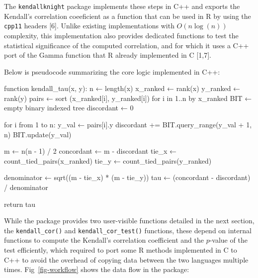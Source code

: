 \documentclass[
  10pt,
  letterpaper,
]{article}
\newenvironment{Shaded}{\begin{snugshade}}{\end{snugshade}}
\newcommand{\CommentTok}[1]{\textcolor[rgb]{0.37,0.37,0.37}{#1}}
\newcommand{\InformationTok}[1]{\textcolor[rgb]{0.37,0.37,0.37}{#1}}
\newcommand{\NormalTok}[1]{\textcolor[rgb]{0.00,0.23,0.31}{#1}}
\newcommand{\OtherTok}[1]{\textcolor[rgb]{0.00,0.23,0.31}{#1}}
\begin{document}
The \texttt{kendallknight} package implements these steps in C++ and
exports the Kendall's correlation coeeficient as a function that can be
used in R by using the \texttt{cpp11} headers {[}6{]}. Unlike existing
implementations with \(O(n \log(n))\) complexity, this implementation
also provides dedicated functions to test the statistical significance
of the computed correlation, and for which it uses a C++ port of the
Gamma function that R already implemented in C {[}1,7{]}.

Below is pseudocode summarizing the core logic implemented in C++:

\begin{Shaded}
\begin{Highlighting}[]
\NormalTok{function kendall\_tau(x, y):}
\NormalTok{    n ← length(x)}
\NormalTok{    x\_ranked ← rank(x)}
\NormalTok{    y\_ranked ← rank(y)}
\NormalTok{    pairs ← sort (x\_ranked}\CommentTok{[}\OtherTok{i}\CommentTok{]}\NormalTok{, y\_ranked}\CommentTok{[}\OtherTok{i}\CommentTok{]}\NormalTok{) for i in 1..n by x\_ranked}
\NormalTok{    BIT ← empty binary indexed tree}
\NormalTok{    discordant ← 0}

\InformationTok{    for i from 1 to n:}
\InformationTok{        y\_val ← pairs[i].y}
\InformationTok{        discordant += BIT.query\_range(y\_val + 1, n)}
\InformationTok{        BIT.update(y\_val)}

\InformationTok{    m ← n(n {-} 1) / 2}
\InformationTok{    concordant ← m {-} discordant}
\InformationTok{    tie\_x ← count\_tied\_pairs(x\_ranked)}
\InformationTok{    tie\_y ← count\_tied\_pairs(y\_ranked)}

\InformationTok{    denominator ← sqrt((m {-} tie\_x) * (m {-} tie\_y))}
\InformationTok{    tau ← (concordant {-} discordant) / denominator}

\InformationTok{    return tau}
\end{Highlighting}
\end{Shaded}

While the package provides two user-visible functions detailed in the
next section, the \texttt{kendall\_cor()} and
\texttt{kendall\_cor\_test()} functions, these depend on internal
functions to compute the Kendall's correlation coefficient and the
\(p\)-value of the test efficiently, which required to port some R
methods implemented in C to C++ to avoid the overhead of copying data
between the two languages multiple times. Fig~\ref{fig-workflow} shows
the data flow in the package:
\end{document}
